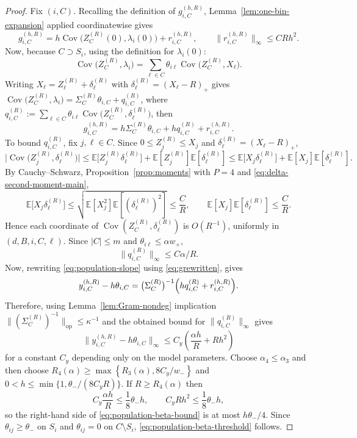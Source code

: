 \documentclass{article}
\newcommand{\E}{\mathbb{E}}
\newcommand{\Cov}{\operatorname{Cov}}
\newcommand{\norm}[1]{\lVert #1\rVert}
\newcommand{\abs}[1]{\lvert #1\rvert}
\newcommand{\op}{\mathrm{op}}
\begin{document}
\begin{proof}
Fix $(i,C)$. Recalling the definition of $g_{i,C}^{(h,R)}$, Lemma~\ref{lem:one-bin-expansion} applied coordinatewise gives
\begin{equation}
\label{eq:g-expand-1}
g_{i,C}^{(h,R)} = h\Cov\bigl(Z_C^{(R)}(0),\lambda_i(0)\bigr)+r_{i,C}^{(h,R)},
\qquad
\norm{r_{i,C}^{(h,R)}}_\infty\le C R h^2.
\end{equation}
Now, because $C\supset S_i$, using the definition for $\lambda_i(0)$:
\[
\Cov\bigl(Z_C^{(R)},\lambda_i\bigr)
=
\sum_{\ell\in C}\theta_{i\ell}\Cov\bigl(Z_C^{(R)},X_\ell\bigr).
\]
Writing $X_\ell = Z_\ell^{(R)} + \delta_\ell^{(R)}$ with $\delta_\ell^{(R)}=(X_\ell-R)_+$ gives $\Cov\bigl(Z_C^{(R)},\lambda_i\bigr)=\Sigma_C^{(R)}\theta_{i,C}+q_{i,C}^{(R)}$, where  $q_{i,C}^{(R)}:=\sum_{\ell\in C}\theta_{i\ell}\Cov\bigl(Z_C^{(R)},\delta_\ell^{(R)}\bigr)$, then 
\begin{equation}
    \label{eq:grewritten}
    g_{i,C}^{(h,R)} = h\Sigma_C^{(R)}\theta_{i,C} + h q_{i,C}^{(R)} + r_{i,C}^{(h,R)}.
\end{equation}
To bound $q_{i,C}^{(R)}$, fix $j,\ell\in C$. Since $0\le Z_j^{(R)}\le X_j$ and $\delta_\ell^{(R)}=(X_\ell-R)_+$,
\[
\abs{\Cov\bigl(Z_j^{(R)},\delta_\ell^{(R)}\bigr)}
\le \E\bigl[Z_j^{(R)}\delta_\ell^{(R)}\bigr] + \E[Z_j^{(R)}]\E[\delta_\ell^{(R)}]
\le \E\bigl[X_j\delta_\ell^{(R)}\bigr] + \E[X_j]\E[\delta_\ell^{(R)}].
\]
By Cauchy--Schwarz, Proposition~\ref{prop:moments} with $P=4$ and \eqref{eq:delta-second-moment-main},
\[
\E\bigl[X_j\delta_\ell^{(R)}\bigr]
\le \sqrt{\E[X_j^2]\E[(\delta_\ell^{(R)})^2]}
\le \frac{C}{R},
\qquad
\E[X_j]\E[\delta_\ell^{(R)}]\le \frac{C}{R}.
\]
Hence each coordinate of $\Cov(Z_C^{(R)},\delta_\ell^{(R)})$ is $O(R^{-1})$, uniformly in $(d,B,i,C,\ell)$. Since $|C|\le m$ and $\theta_{i\ell}\le \alpha w_+$, 
\[ \norm{q_{i,C}^{(R)}}_\infty\le C \alpha/R. 
\]
Now, rewriting \eqref{eq:population-slope} using \eqref{eq:grewritten}, gives
\[
y_{i,C}^{(h,R)} - h\theta_{i,C}
=
\bigl(\Sigma_C^{(R)}\bigr)^{-1}\Bigl(h q_{i,C}^{(R)} + r_{i,C}^{(h,R)}\Bigr).
\]
Therefore, using Lemma~\ref{lem:Gram-nondeg} implication $\norm{(\Sigma_C^{(R)})^{-1}}_\op\le \kappa^{-1}$ and the obtained bound for $\norm{q_{i,C}^{(R)}}_\infty$ gives
\[
\norm{y_{i,C}^{(h,R)} - h\theta_{i,C}}_\infty
\le C_y\left(\frac{\alpha h}{R} + R h^2\right)
\]
for a constant $C_y$ depending only on the model parameters. Choose $\alpha_4\le \alpha_3$ and then choose $R_4(\alpha)\ge \max\left\{R_3(\alpha), 8C_y/w_-\right\}$ and $0<h\le \min\{1,\theta_-/(8C_yR)\}$. If $R\ge R_4(\alpha)$ then
\[
C_y\frac{\alpha h}{R}\le \frac18\theta_-h,
\qquad
C_y R h^2\le \frac18\theta_- h,
\]
so the right-hand side of \eqref{eq:population-beta-bound} is at most $h \theta_-/4$. Since $\theta_{ij}\ge \theta_-$ on $S_i$ and $\theta_{ij}=0$ on $C\setminus S_i$, \eqref{eq:population-beta-threshold} follows.
\end{proof}
\end{document}
